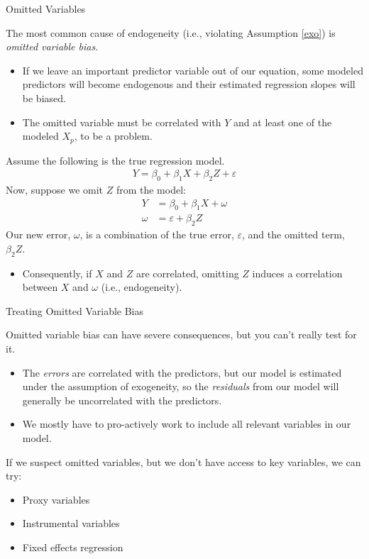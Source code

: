 \documentclass{beamer}\usepackage[]{graphicx}\usepackage[]{color}
\begin{document}
\begin{frame}[allowframebreaks]{Omitted Variables}

  The most common cause of endogeneity (i.e., violating Assumption \ref{exo}) is 
  \emph{omitted variable bias}.
  \vb
  \begin{itemize}
  \item If we leave an important predictor variable out of our equation, some 
    modeled predictors will become endogenous and their estimated regression 
    slopes will be biased.
    \vb
  \item The omitted variable must be correlated with $Y$ and at least one of the 
    modeled $X_p$, to be a problem.
  \end{itemize}
  
  \pagebreak
  
  Assume the following is the true regression model.
  \begin{align*}
    Y = \beta_0 + \beta_1X + \beta_2Z + \varepsilon
  \end{align*} 
  Now, suppose we omit $Z$ from the model:
  \begin{align*}
    Y &= \beta_0 + \beta_1X + \omega\\
    \omega &= \varepsilon + \beta_2Z
  \end{align*} 
  Our new error, $\omega$, is a combination of the true error, $\varepsilon$, 
  and the omitted term, $\beta_2Z$.
  \begin{itemize}
  \item Consequently, if $X$ and $Z$ are correlated, omitting $Z$ induces a 
    correlation between $X$ and $\omega$ (i.e., endogeneity).
  \end{itemize}
  
\end{frame}


\begin{frame}{Treating Omitted Variable Bias}
  
  Omitted variable bias can have severe consequences, but you can't really test 
  for it.
  \begin{itemize}
  \item The \emph{errors} are correlated with the predictors, but our model is 
    estimated under the assumption of exogeneity, so the \emph{residuals} from 
    our model will generally be uncorrelated with the predictors.
  \item We mostly have to pro-actively work to include all relevant variables in 
    our model.
  \end{itemize}
  \vb
  If we suspect omitted variables, but we don't have access to key variables, 
  we can try:
  \begin{itemize}
  \item Proxy variables
  \item Instrumental variables
  \item Fixed effects regression
  \end{itemize}
  
\end{frame}
\end{document}
